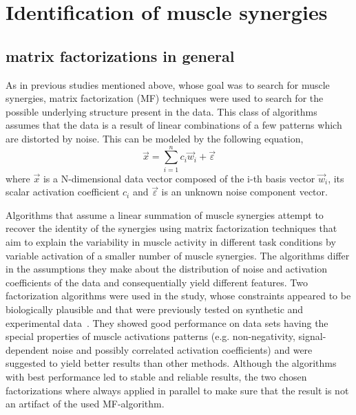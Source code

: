 



\section{Identification of muscle synergies} %
\label{sg:sec:factorization}

\subsection{matrix factorizations in general} %
\label{sg:sub:mf}

As in previous studies mentioned above, whose goal was to search for muscle synergies, matrix factorization (MF) techniques were used to search for the possible underlying structure present in the data. This class of algorithms assumes that the data is a result of linear combinations of a few patterns which are distorted by noise. This can be modeled by the following equation,
\begin{equation}
	\vec{x} = \sum_{i=1}^n c_{i} \vec{w}_{i} + \vec{\varepsilon}
\end{equation}
where $\vec{x}$ is a N-dimensional data vector composed of the i-th basis vector $\vec{w}_{i}$, its scalar activation coefficient $c_{i}$ 
and $\vec{\varepsilon}$ is an unknown noise component vector.


Algorithms that assume a linear summation of muscle synergies attempt to recover the identity of the synergies using matrix factorization techniques that aim to explain the variability in muscle activity in different task conditions by variable activation of a smaller number of muscle synergies. The algorithms differ in the assumptions they make about the distribution of noise and activation coefficients of the data and consequentially yield different features. Two factorization algorithms were used in the study, whose constraints appeared to be biologically plausible and that were previously tested on synthetic and experimental data~\citet{Tresch:2006p3766}. They showed good performance on data sets having the special properties of muscle activations patterns (e.g. non-negativity, signal-dependent noise and possibly correlated activation coefficients) and were suggested to yield better results than other methods. Although the algorithms with best performance led to stable and reliable results, the two chosen factorizations where always applied in parallel to make sure that the result is not an artifact of the used MF-algorithm. 

